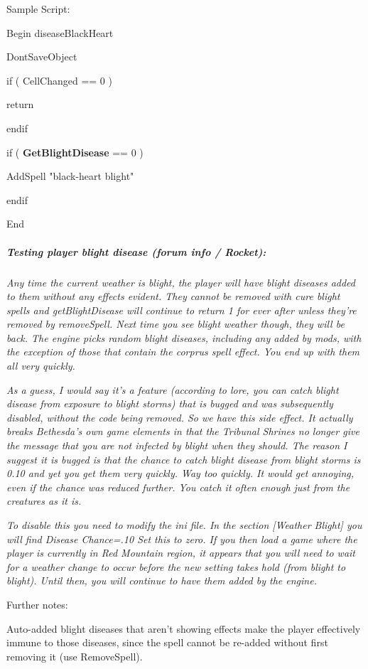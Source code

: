 \documentclass[
]{article}
\begin{document}
Sample Script:

Begin diseaseBlackHeart

DontSaveObject

if ( CellChanged == 0 )

return

endif

if ( \textbf{GetBlightDisease} == 0 )

AddSpell "black-heart blight"

endif

End

\hypertarget{testing-player-blight-disease-forum-info-rocket}{%
\subparagraph{Testing player blight disease (forum info /
Rocket):}\label{testing-player-blight-disease-forum-info-rocket}}

\emph{Any time the current weather is blight, the player will have
blight diseases added to them without any effects evident. They cannot
be removed with cure blight spells and getBlightDisease will continue to
return 1 for ever after unless they're removed by removeSpell. Next time
you see blight weather though, they will be back. The engine picks
random blight diseases, including any added by mods, with the exception
of those that contain the corprus spell effect. You end up with them all
very quickly.}

\emph{As a guess, I would say it's a feature (according to lore, you can
catch blight disease from exposure to blight storms) that is bugged and
was subsequently disabled, without the code being removed. So we have
this side effect. It actually breaks Bethesda's own game elements in
that the Tribunal Shrines no longer give the message that you are not
infected by blight when they should. The reason I suggest it is bugged
is that the chance to catch blight disease from blight storms is 0.10
and yet you get them very quickly. Way too quickly. It would get
annoying, even if the chance was reduced further. You catch it often
enough just from the creatures as it is.}

\emph{To disable this you need to modify the ini file. In the section
{[}Weather Blight{]} you will find Disease Chance=.10 Set this to zero.
If you then load a game where the player is currently in Red Mountain
region, it appears that you will need to wait for a weather change to
occur before the new setting takes hold (from blight to blight). Until
then, you will continue to have them added by the engine.}

Further notes:

Auto-added blight diseases that aren't showing effects make the player
effectively immune to those diseases, since the spell cannot be re-added
without first removing it (use RemoveSpell).
\end{document}
